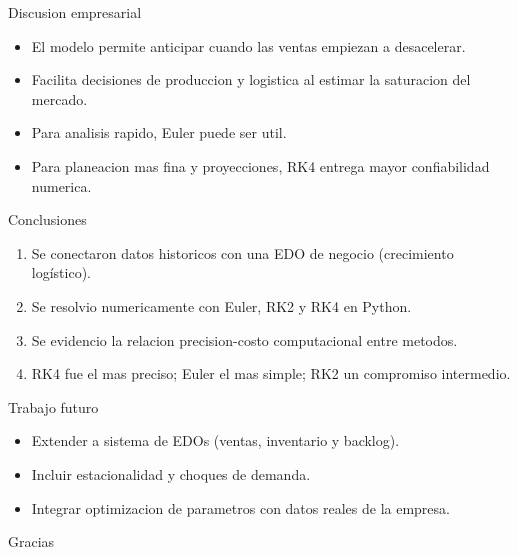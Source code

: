 \documentclass[aspectratio=169]{beamer}
\begin{document}
\begin{frame}{Discusion empresarial}
\begin{itemize}
  \item El modelo permite anticipar cuando las ventas empiezan a desacelerar.
  \item Facilita decisiones de produccion y logistica al estimar la saturacion del mercado.
  \item Para analisis rapido, Euler puede ser util.
  \item Para planeacion mas fina y proyecciones, RK4 entrega mayor confiabilidad numerica.
\end{itemize}
\end{frame}

\begin{frame}{Conclusiones}
\begin{enumerate}
  \item Se conectaron datos historicos con una EDO de negocio (crecimiento log\'istico).
  \item Se resolvio numericamente con Euler, RK2 y RK4 en Python.
  \item Se evidencio la relacion precision-costo computacional entre metodos.
  \item RK4 fue el mas preciso; Euler el mas simple; RK2 un compromiso intermedio.
\end{enumerate}
\end{frame}

\begin{frame}{Trabajo futuro}
\begin{itemize}
  \item Extender a sistema de EDOs (ventas, inventario y backlog).
  \item Incluir estacionalidad y choques de demanda.
  \item Integrar optimizacion de parametros con datos reales de la empresa.
\end{itemize}
\end{frame}

\begin{frame}
\centering
\Huge Gracias
\end{frame}
\end{document}
